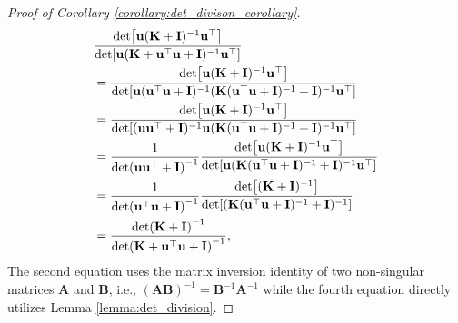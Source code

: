 \begin{proof} [Proof of Corollary \ref{corollary:det_divison_corollary}]
    \begin{align}
        & \frac{\det[\mathbf{u}(\mathbf{K}+\mathbf{I})^{-1} \mathbf{u}^\top]}{\det [\mathbf{u}(\mathbf{K}+ \mathbf{u}^\top \mathbf{u} + \mathbf{I})^{-1} \mathbf{u}^\top]} \notag
        \\
        &= \frac{\det[\mathbf{u}(\mathbf{K}+\mathbf{I})^{-1} \mathbf{u}^\top]}{\det [\mathbf{u} (\mathbf{u}^\top \mathbf{u}+\mathbf{I})^{-1}(\mathbf{K} (\mathbf{u}^\top \mathbf{u} + \mathbf{I})^{-1} + \mathbf{I})^{-1} \mathbf{u}^\top]}
        \\
        &=\frac{\det[\mathbf{u}(\mathbf{K}+\mathbf{I})^{-1} \mathbf{u}^\top]}{\det [ (\mathbf{u} \mathbf{u}^\top+\mathbf{I})^{-1}\mathbf{u} (\mathbf{K} (\mathbf{u}^\top \mathbf{u} + \mathbf{I})^{-1} + \mathbf{I})^{-1} \mathbf{u}^\top]}
        \\
        &= \frac{1}{\det (\mathbf{u} \mathbf{u}^\top+\mathbf{I})^{-1}} \frac{\det[\mathbf{u}(\mathbf{K}+\mathbf{I})^{-1} \mathbf{u}^\top]}{\det [\mathbf{u} (\mathbf{K} (\mathbf{u}^\top \mathbf{u} + \mathbf{I})^{-1} + \mathbf{I})^{-1} \mathbf{u}^\top]}
        \\
        &=\frac{1}{\det (\mathbf{u} ^\top \mathbf{u}+\mathbf{I})^{-1}} \frac{\det[(\mathbf{K}+\mathbf{I})^{-1}]}{\det [ (\mathbf{K} (\mathbf{u}^\top \mathbf{u} + \mathbf{I})^{-1} + \mathbf{I})^{-1}]}
        \\
        &= \frac{\det (\mathbf{K}+\mathbf{I})^{-1}}{\det(\mathbf{K}+\mathbf{u}^\top \mathbf{u}+\mathbf{I})^{-1}},
    \end{align}
The second equation uses the matrix inversion identity of two non-singular matrices $\mathbf{A}$ and $\mathbf{B}$, i.e., $(\mathbf{A}\mathbf{B})^{-1} = \mathbf{B}^{-1} \mathbf{A}^{-1}$ while the fourth equation directly utilizes Lemma \ref{lemma:det_division}.
\end{proof}

